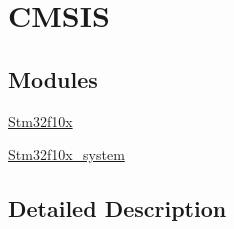 \hypertarget{group___c_m_s_i_s}{}\section{C\+M\+S\+IS}
\label{group___c_m_s_i_s}
\subsection*{Modules}
\begin{DoxyCompactItemize}
\item 
\hyperlink{group__stm32f10x}{Stm32f10x}
\item 
\hyperlink{group__stm32f10x__system}{Stm32f10x\+\_\+system}
\end{DoxyCompactItemize}


\subsection{Detailed Description}
